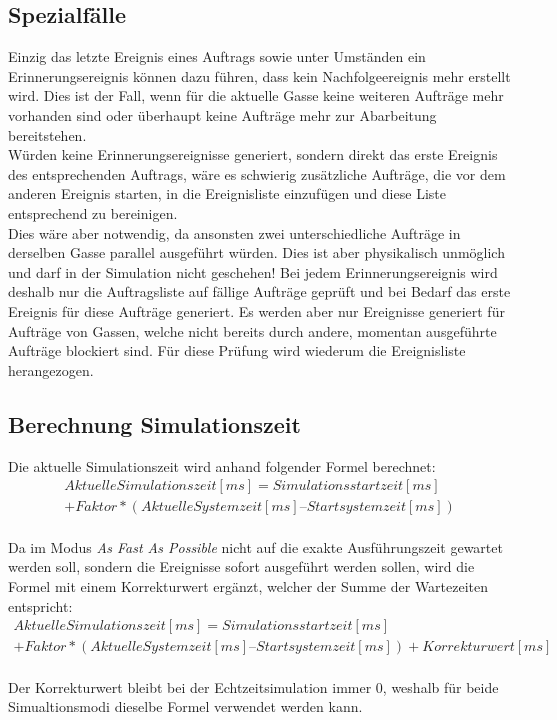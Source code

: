 \subsection{Spezialfälle}
Einzig das letzte Ereignis eines Auftrags sowie unter Umständen ein Erinnerungsereignis können dazu führen, dass kein Nachfolgeereignis mehr erstellt wird. Dies ist der Fall, wenn für die aktuelle Gasse keine weiteren Aufträge mehr vorhanden sind oder überhaupt keine Aufträge mehr zur Abarbeitung bereitstehen.\\
Würden keine Erinnerungsereignisse generiert, sondern direkt das erste Ereignis des entsprechenden Auftrags, wäre es schwierig  zusätzliche Aufträge, die vor dem anderen Ereignis starten, in die Ereignisliste einzufügen und diese Liste entsprechend zu bereinigen.\\
Dies wäre aber notwendig, da ansonsten zwei unterschiedliche Aufträge in derselben Gasse parallel ausgeführt würden. Dies ist aber physikalisch unmöglich und darf in der Simulation nicht geschehen! Bei jedem Erinnerungsereignis wird deshalb nur die Auftragsliste auf fällige Aufträge geprüft und bei Bedarf das erste Ereignis für diese Aufträge generiert. Es werden aber nur Ereignisse generiert für Aufträge von Gassen, welche nicht bereits durch andere, momentan ausgeführte Aufträge blockiert sind. Für diese Prüfung wird wiederum die Ereignisliste herangezogen.\\
%
\subsection{Berechnung Simulationszeit}
Die aktuelle Simulationszeit wird anhand folgender Formel berechnet:\\
\begin{equation}
   \begin{split}
 Aktuelle Simulationszeit [ms] = Simulationsstartzeit [ms] \\
  + Faktor * (Aktuelle Systemzeit [ms] – Startsystemzeit [ms])
     \end{split}
\end{equation}
\\
Da im Modus \textit{As Fast As Possible} nicht auf die exakte Ausführungszeit gewartet werden soll, sondern die Ereignisse sofort ausgeführt werden sollen, wird die Formel mit einem Korrekturwert ergänzt, welcher der Summe der Wartezeiten entspricht:
\\%
\begin{equation}
   \begin{split}
Aktuelle Simulationszeit [ms] = Simulationsstartzeit [ms] \\
  + Faktor * (Aktuelle Systemzeit [ms] – Startsystemzeit [ms]) + Korrekturwert [ms]
     \end{split}
  \end{equation}
\\%
Der Korrekturwert bleibt bei der Echtzeitsimulation immer 0, weshalb für beide Simualtionsmodi dieselbe Formel verwendet werden kann.
%

